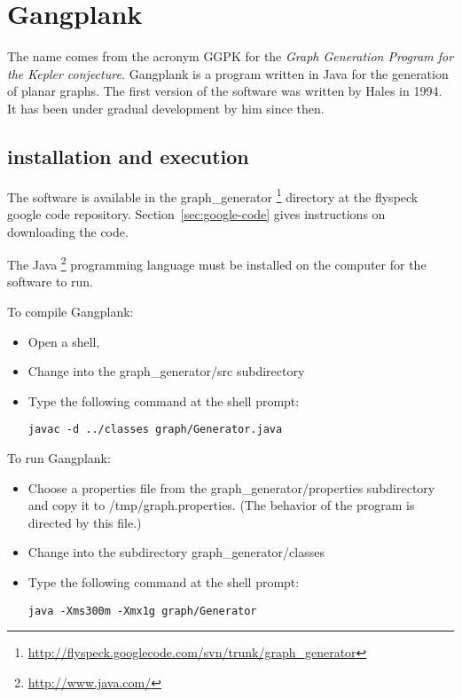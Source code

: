 \section{Gangplank}

The name  comes from the acronym GGPK for the {\it Graph Generation Program for the Kepler conjecture.}   Gangplank is a program written in Java for the generation of planar graphs.  The first version of the software was written by Hales in 1994.  It has been under gradual development by him since then.

\subsection{installation and execution}

The software is available in the graph\_generator%
\footnote {\url{http://flyspeck.googlecode.com/svn/trunk/graph_generator}} %
 directory at the flyspeck google code repository.  Section~\ref{sec:google-code} gives instructions on downloading the code.

The Java%
\footnote{\url{http://www.java.com/}} %
 programming language must be installed on the computer for the software to run.

To compile Gangplank:

\begin{itemize} 
\item Open a shell, 
\item Change into the graph\_generator/src subdirectory
\item Type the following command at the shell prompt:
\begin{verbatim}
javac -d ../classes graph/Generator.java 
\end{verbatim}
\end{itemize}

To run Gangplank:

\begin{itemize}
\item Choose a properties file from the graph\_generator/properties subdirectory and copy it to /tmp/graph.properties.  (The behavior of the program is directed by this file.)
\item Change into the subdirectory graph\_generator/classes
\item Type the following command at the shell prompt:
\begin{verbatim}
java -Xms300m -Xmx1g graph/Generator  
\end{verbatim}
\end{itemize}

